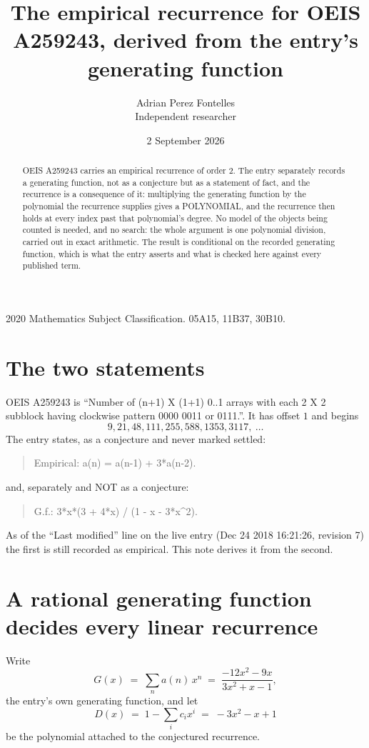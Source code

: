 \documentclass[11pt,a4paper]{article}
\title{The empirical recurrence for OEIS A259243, derived from the entry's generating function}
\author{Adrian Perez Fontelles\\ \small Independent researcher}
\date{2 September 2026}
\theoremstyle{plain}
\theoremstyle{definition}
\begin{document}
\maketitle

\begin{abstract}
OEIS A259243 carries an empirical recurrence of order $2$. The entry separately records a
generating function, not as a conjecture but as a statement of fact, and the recurrence is a
consequence of it: multiplying the generating function by the polynomial the recurrence
supplies gives a POLYNOMIAL, and the recurrence then holds at every index past that
polynomial's degree. No model of the objects being counted is needed, and no search: the
whole argument is one polynomial division, carried out in exact arithmetic. The result is
conditional on the recorded generating function, which is what the entry asserts and what is
checked here against every published term.
\end{abstract}

\noindent\small 2020 Mathematics Subject Classification. 05A15, 11B37, 30B10.\normalsize

\section{The two statements}

OEIS A259243 is ``Number of (n+1) X (1+1) 0..1 arrays with each 2 X 2 subblock having clockwise pattern 0000 0011 or 0111.''. It has offset $1$ and begins
\[
9, 21, 48, 111, 255, 588, 1353, 3117,\ \dots
\]
The entry states, as a conjecture and never marked settled:
\begin{quote}
Empirical: a(n) = a(n-1) + 3*a(n-2).
\end{quote}
and, separately and NOT as a conjecture:
\begin{quote}
G.f.: 3*x*(3 + 4*x) / (1 - x - 3*x\^{}2).
\end{quote}
As of the ``Last modified'' line on the live entry (Dec 24 2018 16:21:26, revision 7) the first is still
recorded as empirical. This note derives it from the second.

\section{A rational generating function decides every linear recurrence}

Write
\[
G(x)\;=\;\sum_{n}a(n)\,x^{n}\;=\;\frac{- 12 x^{2} - 9 x}{3 x^{2} + x - 1},
\]
the entry's own generating function, and let
\[
D(x)\;=\;1-\sum_i c_i x^{i}\;=\;- 3 x^{2} - x + 1
\]
be the polynomial attached to the conjectured recurrence.
\end{document}

